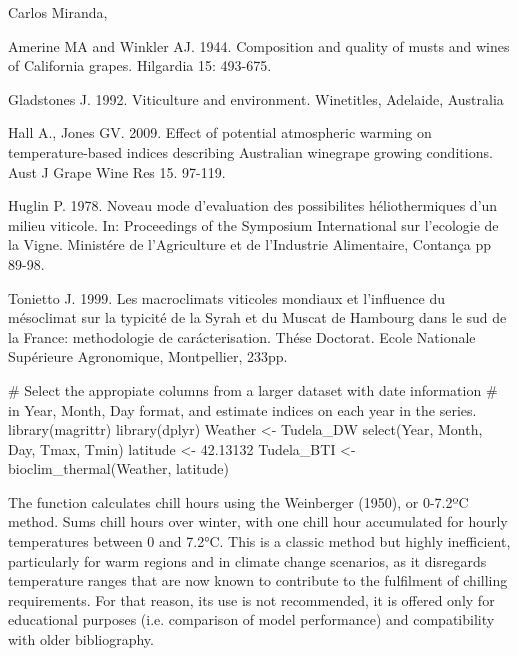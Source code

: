 \documentclass[a4paper]{book}
\begin{document}
%
\begin{Author}\relax
Carlos Miranda, 
\end{Author}
%
\begin{References}\relax
Amerine MA and Winkler AJ. 1944. Composition and quality of musts and wines
of California grapes. Hilgardia 15: 493-675.

Gladstones J. 1992. Viticulture and environment. Winetitles, Adelaide, Australia 

Hall A., Jones GV. 2009. Effect of potential atmospheric warming on 
temperature-based indices describing Australian winegrape growing conditions.
Aust J Grape Wine Res 15. 97-119.

Huglin P. 1978. Noveau mode d'evaluation des possibilites héliothermiques
d'un milieu viticole. In: Proceedings of the Symposium International sur
l'ecologie de la Vigne. Ministére de l'Agriculture et de l'Industrie 
Alimentaire, Contança pp 89-98.

Tonietto J. 1999. Les macroclimats viticoles mondiaux et l'influence du
mésoclimat sur la typicité de la Syrah et du Muscat de Hambourg dans le
sud de la France: methodologie de carácterisation. Thése Doctorat. Ecole 
Nationale Supérieure Agronomique, Montpellier, 233pp.
\end{References}
%
\begin{Examples}
\begin{ExampleCode}

# Select the appropiate columns from a larger dataset with date information
# in Year, Month, Day format, and estimate indices on each year in the series.
library(magrittr)
library(dplyr)
Weather <- Tudela_DW %
   select(Year, Month, Day, Tmax, Tmin)
latitude <- 42.13132
Tudela_BTI <- bioclim_thermal(Weather, latitude)

\end{ExampleCode}
\end{Examples}
%
\begin{Description}\relax
The function calculates chill hours using the Weinberger (1950),
or 0-7.2ºC method. Sums chill hours over winter, with one chill
hour accumulated for hourly temperatures between 0 and 7.2°C.
This is a classic method but highly inefficient, particularly
for warm regions and in climate change scenarios, as it disregards
temperature ranges that are now known to contribute to the fulfilment
of chilling requirements. For that reason, its use is not recommended,
it is offered only for educational purposes (i.e. comparison of model
performance) and compatibility with older bibliography.
\end{Description}
\end{document}
